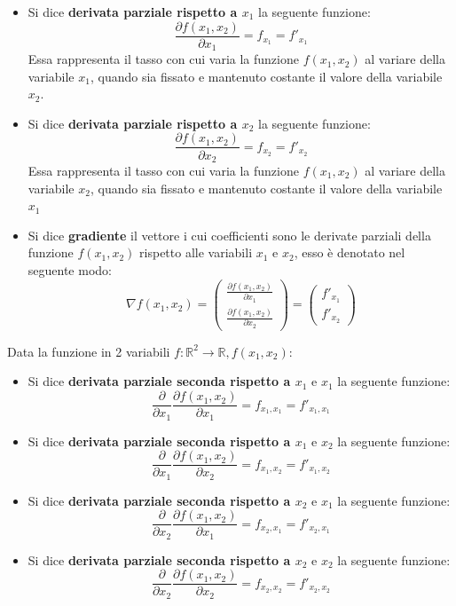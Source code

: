 \documentclass[12pt]{article}
\begin{document}
\begin{itemize}
    \item Si dice \textbf{derivata parziale rispetto a $x_1$} la seguente funzione:
    $$\frac{\partial f(x_1, x_2)}{\partial x_1} = f_{x_1} = f'_{x_1}$$
    Essa rappresenta il tasso con cui varia la funzione $f(x_1, x_2)$ al variare della variabile $x_1$, quando sia fissato e mantenuto costante
    il valore della variabile $x_2$.
    \item Si dice \textbf{derivata parziale rispetto a $x_2$} la seguente funzione:
    $$\frac{\partial f(x_1, x_2)}{\partial x_2} = f_{x_2} = f'_{x_2}$$
    Essa rappresenta il tasso con cui varia la funzione $f(x_1, x_2)$ al variare della variabile $x_2$, quando sia fissato e mantenuto costante
    il valore della variabile $x_1$
    \item Si dice \textbf{gradiente} il vettore i cui coefficienti sono le derivate parziali della funzione $f(x_1, x_2)$ rispetto alle variabili $x_1$ e $x_2$, esso è denotato nel seguente modo:
    $$\nabla f(x_1, x_2) = \begin{pmatrix}
        \frac{\partial f(x_1, x_2)}{\partial x_1} \\
        \frac{\partial f(x_1, x_2)}{\partial x_2}
    \end{pmatrix} = \begin{pmatrix}
        f'_{x_1} \\
        f'_{x_2}
    \end{pmatrix}$$
\end{itemize}
Data la funzione in 2 variabili $f: \mathbb{R}^2 \rightarrow \mathbb{R}, f(x_1, x_2)$:
\begin{itemize}
    \item Si dice \textbf{derivata parziale seconda rispetto a $x_1$} e $x_1$ la seguente funzione:
    $$\frac{\partial}{\partial x_1} \frac{\partial f(x_1, x_2)}{\partial x_1} = f_{x_1, x_1} = f'_{x_1, x_1}$$
    \item Si dice \textbf{derivata parziale seconda rispetto a $x_1$} e $x_2$ la seguente funzione:
    $$\frac{\partial}{\partial x_1} \frac{\partial f(x_1, x_2)}{\partial x_2} = f_{x_1, x_2} = f'_{x_1, x_2}$$
    \item Si dice \textbf{derivata parziale seconda rispetto a $x_2$} e $x_1$ la seguente funzione:
    $$\frac{\partial}{\partial x_2} \frac{\partial f(x_1, x_2)}{\partial x_1} = f_{x_2, x_1} = f'_{x_2, x_1}$$
    \item Si dice \textbf{derivata parziale seconda rispetto a $x_2$} e $x_2$ la seguente funzione:
    $$\frac{\partial}{\partial x_2} \frac{\partial f(x_1, x_2)}{\partial x_2} = f_{x_2, x_2} = f'_{x_2, x_2}$$
\end{itemize}
\end{document}
